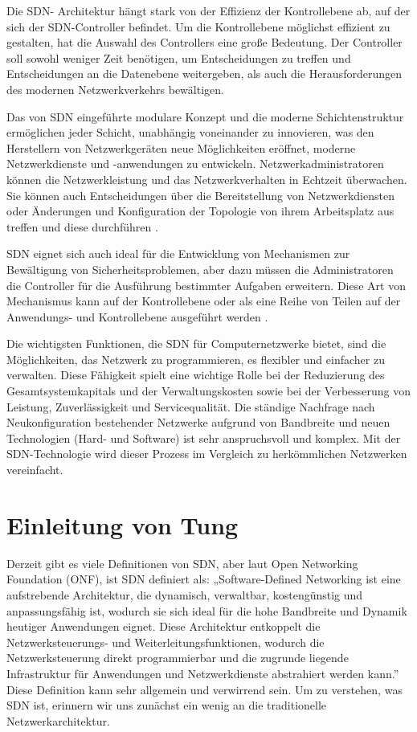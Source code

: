 \documentclass[fontsize=12pt,paper=a4,open=any,parskip=half,
  twoside=false,toc=listof,toc=bibliography,fleqn,leqno,
  captions=nooneline,captions=tableabove,british]{scrbook}
\begin{document}
Die SDN- Architektur hängt stark von der Effizienz der Kontrollebene ab, auf der sich der SDN-Controller befindet. Um die Kontrollebene möglichst effizient zu gestalten, hat die Auswahl des Controllers eine große Bedeutung. Der Controller soll  sowohl weniger Zeit benötigen, um Entscheidungen zu treffen und Entscheidungen an die Datenebene weitergeben, als auch die Herausforderungen des modernen Netzwerkverkehrs bewältigen\cite{rastogi2016comparative}.\par
Das von SDN eingeführte modulare Konzept und die moderne Schichtenstruktur ermöglichen jeder Schicht, unabhängig voneinander zu innovieren, was den Herstellern von Netzwerkgeräten neue Möglichkeiten eröffnet, moderne Netzwerkdienste und -anwendungen zu entwickeln. Netzwerkadministratoren können die Netzwerkleistung und das Netzwerkverhalten in Echtzeit überwachen. Sie können auch Entscheidungen über die Bereitstellung von Netzwerkdiensten oder Änderungen und Konfiguration der Topologie  von ihrem Arbeitsplatz aus treffen und diese durchführen \cite{hasan2020sdn}.\par
SDN eignet sich auch ideal für die Entwicklung von Mechanismen zur Bewältigung von Sicherheitsproblemen, aber dazu müssen die Administratoren die Controller für die Ausführung bestimmter Aufgaben erweitern. Diese Art von Mechanismus kann auf der Kontrollebene oder als eine Reihe von Teilen auf der Anwendungs- und Kontrollebene ausgeführt werden \cite{morales2015extending}.\par
Die wichtigsten Funktionen, die SDN für Computernetzwerke bietet, sind die Möglichkeiten, das Netzwerk zu programmieren, es flexibler und einfacher zu verwalten. Diese Fähigkeit spielt eine wichtige Rolle bei der Reduzierung des Gesamtsystemkapitals und der Verwaltungskosten sowie bei der Verbesserung von Leistung, Zuverlässigkeit und Servicequalität. Die ständige Nachfrage nach Neukonfiguration bestehender Netzwerke aufgrund von Bandbreite und neuen Technologien (Hard- und Software) ist sehr anspruchsvoll und komplex. Mit der SDN-Technologie wird dieser Prozess im Vergleich zu herkömmlichen Netzwerken vereinfacht\cite{hasan2020sdn}.

\newpage
\section*{Einleitung von Tung}\label{einl-tung}
Derzeit gibt es viele Definitionen von SDN, aber laut Open Networking Foundation (ONF), ist SDN definiert als: „Software-Defined Networking ist eine aufstrebende Architektur, die dynamisch, verwaltbar, kostengünstig und anpassungsfähig ist, wodurch sie sich ideal für die hohe Bandbreite und Dynamik heutiger Anwendungen eignet. Diese Architektur entkoppelt die Netzwerksteuerungs- und Weiterleitungsfunktionen, wodurch die Netzwerksteuerung direkt programmierbar und die zugrunde liegende Infrastruktur für Anwendungen und Netzwerkdienste abstrahiert werden kann.”\cite{ONFTung} Diese Definition kann sehr allgemein und verwirrend sein. Um zu verstehen, was SDN ist, erinnern wir uns zunächst ein wenig an die traditionelle Netzwerkarchitektur.
\end{document}
